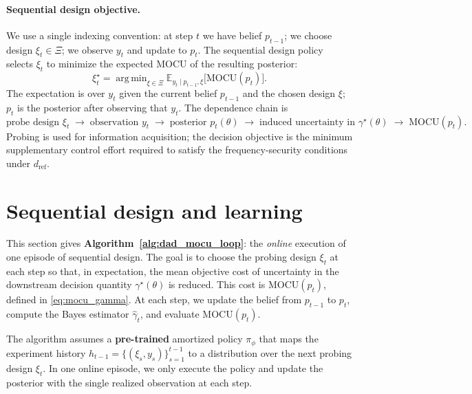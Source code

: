 \documentclass[10pt]{article}
\DeclareMathOperator*{\argmin}{arg\,min}
\newcommand{\MOCU}{\mathrm{MOCU}}
\begin{document}
\paragraph{Sequential design objective.}
We use a single indexing convention: at step $t$ we have belief $p_{t-1}$; we choose design $\xi_t\in\Xi$; we observe $y_t$ and update to $p_t$. The sequential design policy selects $\xi_t$ to minimize the expected MOCU of the resulting posterior:
\begin{equation}
\label{eq:sboed_gamma}
\xi_t^\star
=
\argmin_{\xi\in\Xi}
\mathbb{E}_{y_t\mid p_{t-1},\xi}
\big[
\MOCU(p_t)
\big].
\end{equation}
The expectation is over $y_t$ given the current belief $p_{t-1}$ and the chosen design $\xi$; $p_t$ is the posterior after observing that $y_t$. The dependence chain is
\[
\text{probe design }\xi_t
\;\longrightarrow\;
\text{observation }y_t
\;\longrightarrow\;
\text{posterior }p_t(\theta)
\;\longrightarrow\;
\text{induced uncertainty in }\gamma^\star(\theta)
\;\longrightarrow\;
\MOCU(p_t).
\]
Probing is used for information acquisition; the decision objective is the minimum supplementary control effort required to satisfy the frequency-security conditions under $d_{\mathrm{ref}}$.

\section{Sequential design and learning}
\label{sec:sequential}

This section gives \textbf{Algorithm~\ref{alg:dad_mocu_loop}}: the
\emph{online} execution of one episode of sequential design. The goal is
to choose the probing design $\xi_t$ at each step so that, in expectation, the mean objective cost of uncertainty in the downstream decision quantity $\gamma^\star(\theta)$ is reduced. This cost is $\MOCU(p_t)$, defined in \eqref{eq:mocu_gamma}. At each step, we update the belief from $p_{t-1}$ to $p_t$, compute the Bayes estimator $\hat\gamma_t$, and evaluate $\MOCU(p_t)$.

The algorithm assumes a \textbf{pre-trained} amortized policy
\(\pi_\phi\) that maps the experiment history
\(h_{t-1}=\{(\xi_s,y_s)\}_{s=1}^{t-1}\) to a distribution over the next
probing design \(\xi_t\). In one online episode, we only execute the
policy and update the posterior with the single realized observation at
each step.
\end{document}
